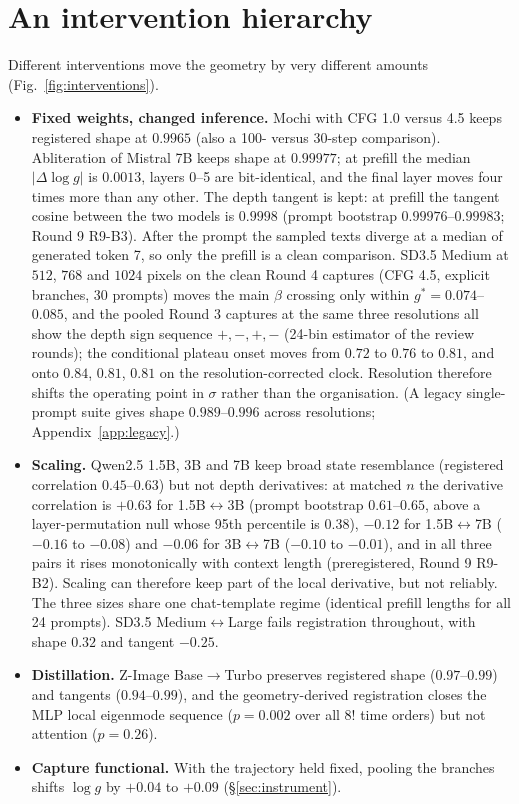 \documentclass[11pt]{article}
\begin{document}
\section{An intervention hierarchy}\label{sec:interventions}

Different interventions move the geometry by very different amounts (Fig.~\ref{fig:interventions}).
\begin{itemize}
 \item \textbf{Fixed weights, changed inference.} Mochi with CFG 1.0 versus 4.5 keeps registered shape at $0.9965$ (also a 100- versus 30-step comparison). Abliteration of Mistral 7B \citep{arditi2024refusal} keeps shape at $0.99977$; at prefill the median $|\Delta\log g|$ is $0.0013$, layers 0--5 are bit-identical, and the final layer moves four times more than any other. The depth tangent is kept: at prefill the tangent cosine between the two models is $0.9998$ (prompt bootstrap $0.99976$--$0.99983$; Round 9 R9-B3). After the prompt the sampled texts diverge at a median of generated token 7, so only the prefill is a clean comparison. SD3.5 Medium at $512$, $768$ and $1024$ pixels on the clean Round 4 captures (CFG 4.5, explicit branches, 30 prompts) moves the main $\beta$ crossing only within $g^*=0.074$--$0.085$, and the pooled Round 3 captures at the same three resolutions all show the depth sign sequence $+,-,+,-$ (24-bin estimator of the review rounds); the conditional plateau onset moves from $0.72$ to $0.76$ to $0.81$, and onto $0.84$, $0.81$, $0.81$ on the resolution-corrected clock. Resolution therefore shifts the operating point in $\sigma$ rather than the organisation. (A legacy single-prompt suite gives shape $0.989$--$0.996$ across resolutions; Appendix~\ref{app:legacy}.)
 \item \textbf{Scaling.} Qwen2.5 1.5B, 3B and 7B keep broad state resemblance (registered correlation $0.45$--$0.63$) but not depth derivatives: at matched $n$ the derivative correlation is $+0.63$ for 1.5B$\leftrightarrow$3B (prompt bootstrap $0.61$--$0.65$, above a layer-permutation null whose 95th percentile is $0.38$), $-0.12$ for 1.5B$\leftrightarrow$7B ($-0.16$ to $-0.08$) and $-0.06$ for 3B$\leftrightarrow$7B ($-0.10$ to $-0.01$), and in all three pairs it rises monotonically with context length (preregistered, Round 9 R9-B2). Scaling can therefore keep part of the local derivative, but not reliably. The three sizes share one chat-template regime (identical prefill lengths for all 24 prompts). SD3.5 Medium$\leftrightarrow$Large fails registration throughout, with shape $0.32$ and tangent $-0.25$.
 \item \textbf{Distillation.} Z-Image Base$\to$Turbo preserves registered shape ($0.97$--$0.99$) and tangents ($0.94$--$0.99$), and the geometry-derived registration closes the MLP local eigenmode sequence ($p=0.002$ over all $8!$ time orders) but not attention ($p=0.26$).
 \item \textbf{Capture functional.} With the trajectory held fixed, pooling the branches shifts $\log g$ by $+0.04$ to $+0.09$ (\S\ref{sec:instrument}).
\end{itemize}
\end{document}

